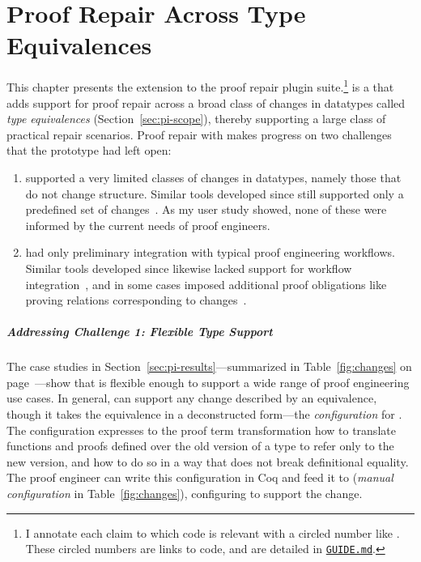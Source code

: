 \chapter{Proof Repair Across Type Equivalences}
\label{chapt:pi}


This chapter presents the \intro{\toolnamec} extension to the \kl{\sysnamelong} proof repair plugin suite.\footnote{I annotate each claim to which code is relevant with a circled number like . These circled numbers are links to code, and are detailed in \href{https://github.com/uwplse/pumpkin-pi/blob/v2.0.0/GUIDE.md}{\lstinline{GUIDE.md}}.} %
\toolnamec is a  that adds support for proof repair across a broad class of changes in datatypes called 
\textit{type equivalences} (Section~\ref{sec:pi-scope}),
thereby supporting a large class of practical repair scenarios.
Proof repair  with \toolnamec makes progress on two challenges that the \sysname prototype had left open:

\begin{enumerate}
\item \sysname supported a very limited classes of changes in datatypes, namely those that do not change structure.
Similar tools developed since still supported only a predefined set of changes~\cite{robert2018, wibergh2019}. As my user study showed, none of these were informed by the current needs of proof engineers. %
\item \sysname had only preliminary integration with typical proof engineering workflows.
Similar tools developed since likewise lacked support for workflow integration~\cite{PGL-045, robert2018},
and in some cases imposed additional proof obligations like proving relations corresponding to changes~\cite{tabareau2019marriage}.
\end{enumerate}

\paragraph{Addressing Challenge 1: Flexible Type Support}
The case studies in Section~\ref{sec:pi-results}---summarized in Table~\ref{fig:changes} on page~\pageref{fig:changes}---show that \toolnamec is flexible enough to support
a wide range of proof engineering use cases. %
In general, \toolnamec can support any change described by an equivalence, though it takes the equivalence in a
deconstructed form---the \textit{configuration} for \toolnamec. %
The configuration expresses to the proof term transformation how to translate functions and proofs defined over the old version of a type
to refer only to the new version, and how to do so in a way that does not break definitional equality.
The proof engineer can write this configuration in Coq and feed it to \toolnamec (\textit{manual configuration} in Table~\ref{fig:changes}),
configuring \toolnamec to support the change. %

